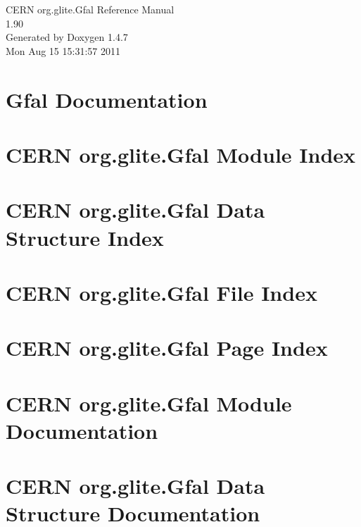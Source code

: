 \documentclass[a4paper]{book}
\begin{document}
\begin{titlepage}
\vspace*{7cm}
\begin{center}
{\Large CERN org.glite.Gfal Reference Manual\\[1ex]\large 1.90 }\\
\vspace*{1cm}
{\large Generated by Doxygen 1.4.7}\\
\vspace*{0.5cm}
{\small Mon Aug 15 15:31:57 2011}\\
\end{center}
\end{titlepage}
\clearemptydoublepage
{}
\tableofcontents
\clearemptydoublepage
{}
\chapter{Gfal Documentation }
\label{index}
\chapter{CERN org.glite.Gfal Module Index}

\chapter{CERN org.glite.Gfal Data Structure Index}

\chapter{CERN org.glite.Gfal File Index}

\chapter{CERN org.glite.Gfal Page Index}

\chapter{CERN org.glite.Gfal Module Documentation}

\chapter{CERN org.glite.Gfal Data Structure Documentation}





\end{document}
